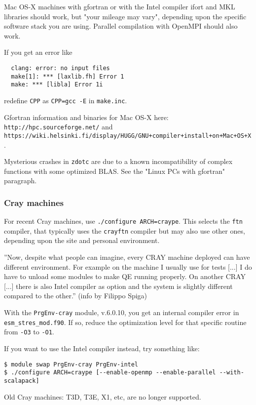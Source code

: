 \documentclass[12pt,a4paper]{article}
\begin{document}
Mac OS-X machines with gfortran or with the Intel compiler ifort
and MKL libraries should work, but "your mileage may vary", depending
upon the specific software stack you are using. Parallel compilation
with OpenMPI should also work.

If you get an error like
\begin{verbatim}
  clang: error: no input files
  make[1]: *** [laxlib.fh] Error 1
  make: *** [libla] Error 1i
\end{verbatim}
redefine \texttt{CPP} as \texttt{CPP=gcc -E} in \texttt{make.inc}.

Gfortran information and binaries for Mac OS-X here:
\texttt{http://hpc.sourceforge.net/} and
\texttt{https://wiki.helsinki.fi/display/HUGG/GNU+compiler+install+on+Mac+OS+X}.

Mysterious crashes in \texttt{zdotc} are due to a known incompatibility of
complex functions with some optimized BLAS. See the "Linux PCs with gfortran"
paragraph.

\subsubsection{Cray machines}

For recent Cray machines, use \texttt{./configure ARCH=craype}.
This selects the \texttt{ftn} compiler, that typically uses
the \texttt{crayftn} compiler but may also use other ones,
depending upon the site and personal environment.

''Now, despite what people can imagine, every CRAY machine deployed can
have different environment. For example on the machine I usually use
for tests [...] I do have to unload some modules to make QE running
properly. On another CRAY [...] there is also Intel compiler as option
and the system is slightly different compared to the other.'' 
(info by Filippo Spiga)

With the \verb|PrgEnv-cray| module, v.6.0.10, you get an internal compiler 
error in \verb|esm_stres_mod.f90|. If so, reduce the optimization level
for that specific routine from \verb|-O3| to \verb|-O1|.

If you want to use the Intel compiler instead, try something like:
\begin{verbatim}
$ module swap PrgEnv-cray PrgEnv-intel
$ ./configure ARCH=craype [--enable-openmp --enable-parallel --with-scalapack]
\end{verbatim}

Old Cray machines: T3D, T3E, X1, etc, are no longer supported.
\end{document}
